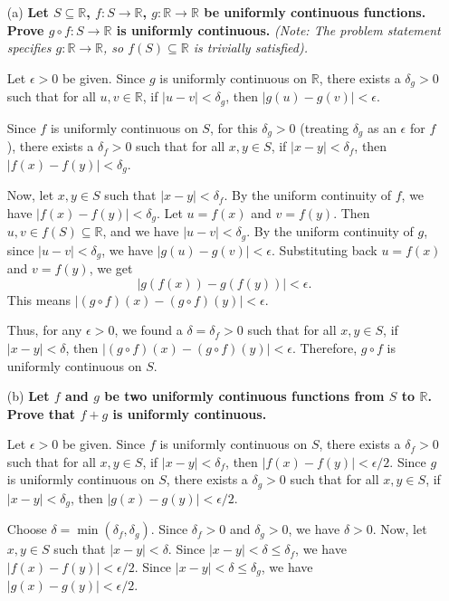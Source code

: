 \documentclass{article}
\newcommand{\R}{\mathbb{R}}
\begin{document}
\begin{enumerate}
  \item[(a)] \textbf{Let \(S \subseteq \R\), \(f: S \to \R\), \(g: \R \to \R\) be uniformly continuous functions. Prove \(g \circ f: S \to \R\) is uniformly continuous.}
    \textit{(Note: The problem statement specifies \(g: \R \to \R\), so \(f(S) \subseteq \R\) is trivially satisfied).}

    Let \(\epsilon > 0\) be given. Since \(g\) is uniformly continuous on \(\R\), there exists a \(\delta_g > 0\) such that for all \(u, v \in \R\), if \(|u-v| < \delta_g\), then \(|g(u) - g(v)| < \epsilon\).

    Since \(f\) is uniformly continuous on \(S\), for this \(\delta_g > 0\) (treating \(\delta_g\) as an \(\epsilon\) for \(f\)), there exists a \(\delta_f > 0\) such that for all \(x, y \in S\), if \(|x-y| < \delta_f\), then \(|f(x) - f(y)| < \delta_g\).

    Now, let \(x, y \in S\) such that \(|x-y| < \delta_f\).
    By the uniform continuity of \(f\), we have \(|f(x) - f(y)| < \delta_g\).
    Let \(u = f(x)\) and \(v = f(y)\). Then \(u, v \in f(S) \subseteq \R\), and we have \(|u-v| < \delta_g\).
    By the uniform continuity of \(g\), since \(|u-v| < \delta_g\), we have \(|g(u) - g(v)| < \epsilon\).
    Substituting back \(u=f(x)\) and \(v=f(y)\), we get
    \[ |g(f(x)) - g(f(y))| < \epsilon. \]
    This means \(|(g \circ f)(x) - (g \circ f)(y)| < \epsilon\).

    Thus, for any \(\epsilon > 0\), we found a \(\delta = \delta_f > 0\) such that for all \(x, y \in S\), if \(|x-y| < \delta\), then \(|(g \circ f)(x) - (g \circ f)(y)| < \epsilon\).
    Therefore, \(g \circ f\) is uniformly continuous on \(S\).

  \item[(b)] \textbf{Let \(f\) and \(g\) be two uniformly continuous functions from \(S\) to \(\R\). Prove that \(f+g\) is uniformly continuous.}

    Let \(\epsilon > 0\) be given. Since \(f\) is uniformly continuous on \(S\), there exists a \(\delta_f > 0\) such that for all \(x, y \in S\), if \(|x-y| < \delta_f\), then \(|f(x) - f(y)| < \epsilon/2\).
    Since \(g\) is uniformly continuous on \(S\), there exists a \(\delta_g > 0\) such that for all \(x, y \in S\), if \(|x-y| < \delta_g\), then \(|g(x) - g(y)| < \epsilon/2\).

    Choose \(\delta = \min(\delta_f, \delta_g)\). Since \(\delta_f > 0\) and \(\delta_g > 0\), we have \(\delta > 0\).
    Now, let \(x, y \in S\) such that \(|x-y| < \delta\).
    Since \(|x-y| < \delta \le \delta_f\), we have \(|f(x) - f(y)| < \epsilon/2\).
    Since \(|x-y| < \delta \le \delta_g\), we have \(|g(x) - g(y)| < \epsilon/2\).


\end{enumerate}
\end{document}
